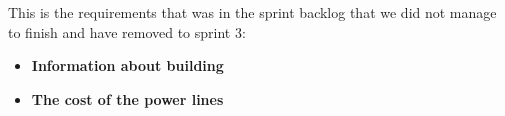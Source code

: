 	This is the requirements that was in the sprint backlog that we did not
	manage to finish and have removed to sprint 3:

	\begin{itemize}
		\item {\bf Information about building}

		\item {\bf The cost of the power lines}

	\end{itemize}

	\begin{figure}[H]
	\centering
\end{figure}
